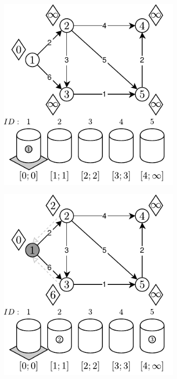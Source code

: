 \begin{figure}[!htbp]
	\centering
	\begin{subfigure}[b]{0.33\textwidth}
		\includegraphics[width=\textwidth]{Chapter_II/1/a.pdf}
		\caption{}
	\end{subfigure}%
	\begin{subfigure}[b]{0.33\textwidth}
		\includegraphics[width=\textwidth]{Chapter_II/1/b.pdf}

\end{subfigure}
\end{figure}
